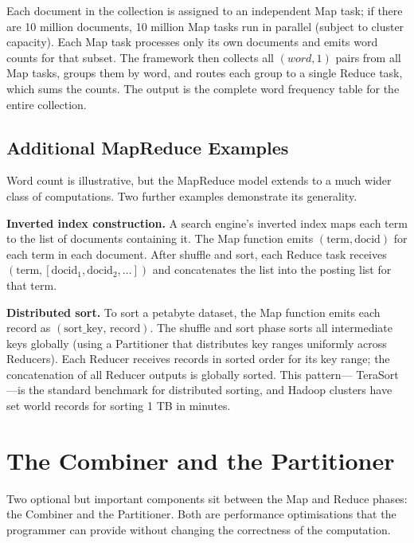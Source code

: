 Each document in the collection is assigned to an independent Map
task; if there are 10 million documents, 10 million Map tasks run in
parallel (subject to cluster capacity). Each Map task processes only
its own documents and emits word counts for that subset. The framework
then collects all $(word, 1)$ pairs from all Map tasks, groups them
by word, and routes each group to a single Reduce task, which sums
the counts. The output is the complete word frequency table for the
entire collection.

\subsection{Additional MapReduce Examples}
\label{subsec:mr-examples}

Word count is illustrative, but the MapReduce model extends to a much
wider class of computations. Two further examples demonstrate its
generality.

\textbf{Inverted index construction.} A search engine's inverted index
maps each term to the list of documents containing it. The Map
function emits $(\text{term}, \text{docid})$ for each term in each
document. After shuffle and sort, each Reduce task receives
$(\text{term}, [\text{docid}_1, \text{docid}_2, \ldots])$ and
concatenates the list into the posting list for that term.

\textbf{Distributed sort.} To sort a petabyte dataset, the Map
function emits each record as $(\text{sort\_key},\, \text{record})$.
The shuffle and sort phase sorts all intermediate keys globally (using
a Partitioner that distributes key ranges uniformly across Reducers).
Each Reducer receives records in sorted order for its key range; the
concatenation of all Reducer outputs is globally sorted. This pattern---
TeraSort---is the standard benchmark for distributed sorting, and
Hadoop clusters have set world records for sorting 1 TB in minutes.

\section{The Combiner and the Partitioner}
\label{sec:combiner-partitioner}

Two optional but important components sit between the Map and Reduce
phases: the Combiner and the Partitioner. Both are performance
optimisations that the programmer can provide without changing the
correctness of the computation.

